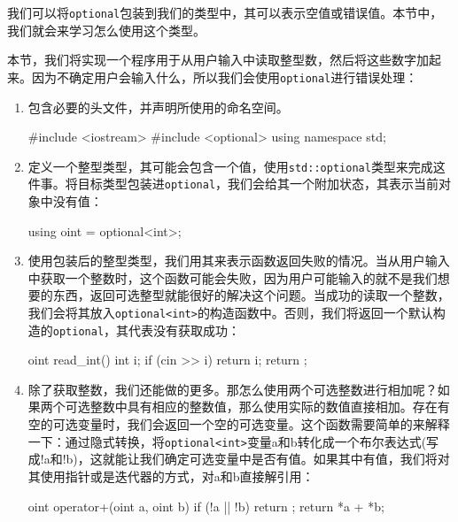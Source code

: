 我们可以将\texttt{optional}包装到我们的类型中，其可以表示空值或错误值。本节中，我们就会来学习怎么使用这个类型。


本节，我们将实现一个程序用于从用户输入中读取整型数，然后将这些数字加起来。因为不确定用户会输入什么，所以我们会使用\texttt{optional}进行错误处理：

\begin{enumerate}
\item 包含必要的头文件，并声明所使用的命名空间。

\begin{codebox}[cpp]
#include <iostream>
#include <optional>
using namespace std; 
\end{codebox}

\item 定义一个整型类型，其可能会包含一个值，使用\texttt{std::optional}类型来完成这件事。将目标类型包装进\texttt{optional}，我们会给其一个附加状态，其表示当前对象中没有值：

\begin{codebox}[cpp]
using oint = optional<int>;
\end{codebox}

\item 使用包装后的整型类型，我们用其来表示函数返回失败的情况。当从用户输入中获取一个整数时，这个函数可能会失败，因为用户可能输入的就不是我们想要的东西，返回可选整型就能很好的解决这个问题。当成功的读取一个整数，我们会将其放入\texttt{optional<int>}的构造函数中。否则，我们将返回一个默认构造的\texttt{optional}，其代表没有获取成功：

\begin{codebox}[cpp]
oint read_int()
{
    int i;
    if (cin >> i) { return {i}; }
    return {};
}
\end{codebox}

\item 除了获取整数，我们还能做的更多。那怎么使用两个可选整数进行相加呢？如果两个可选整数中具有相应的整数值，那么使用实际的数值直接相加。存在有空的可选变量时，我们会返回一个空的可选变量。这个函数需要简单的来解释一下：通过隐式转换，将\texttt{optional<int>}变量a和b转化成一个布尔表达式(写成!a和!b)，这就能让我们确定可选变量中是否有值。如果其中有值，我们将对其使用指针或是迭代器的方式，对a和b直接解引用：

\begin{codebox}[cpp]
oint operator+(oint a, oint b)
{
    if (!a || !b) { return {}; }
    return {*a + *b};
}
\end{codebox}


\end{enumerate}
